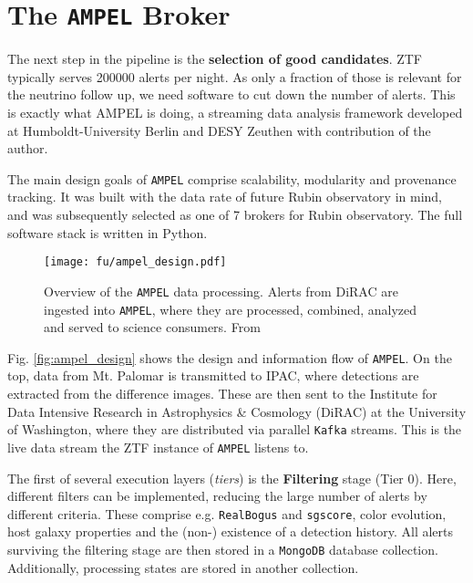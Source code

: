 \section{The \texttt{AMPEL} Broker} \label{ampel}
The next step in the pipeline is the \textbf{selection of good candidates}. ZTF typically serves 200000 alerts per night. As only a fraction of those is relevant for the neutrino follow up, we need software to cut down the number of alerts. This is exactly what AMPEL is doing, a streaming data analysis framework developed at Humboldt-University Berlin and DESY Zeuthen with contribution of the author.

The main design goals of \texttt{AMPEL} comprise scalability, modularity and provenance tracking. It was built with the data rate of future Rubin observatory  in mind, and was subsequently selected as one of 7 brokers for Rubin observatory. The full software stack is written in Python.


\begin{figure}[h!]
    \texttt{[image: fu/ampel\_design.pdf]}
    \caption[\texttt{AMPEL} overview]{Overview of the \texttt{AMPEL} data processing. Alerts from DiRAC are ingested into \texttt{AMPEL}, where they are processed, combined, analyzed and served to science consumers. From \cite{Nordin2019}}
\end{figure}

Fig. \ref{fig:ampel_design} shows the design and information flow of \texttt{AMPEL}. On the top, data from Mt. Palomar is transmitted to IPAC, where detections are extracted from the difference images. These are then sent to the Institute for Data Intensive Research in Astrophysics \& Cosmology (DiRAC) at the University of Washington, where they are distributed via parallel \texttt{Kafka} streams. This is the live data stream the ZTF instance of \texttt{AMPEL} listens to.

The first of several execution layers (\textit{tiers}) is the \textbf{Filtering} stage (Tier 0). Here, different filters can be implemented, reducing the large number of alerts by different criteria. These comprise e.g. \texttt{RealBogus} and \texttt{sgscore}, color evolution, host galaxy properties and the (non-) existence of a detection history. All alerts surviving the filtering stage are then stored in a \texttt{MongoDB} database collection. Additionally, processing states are stored in another collection.

